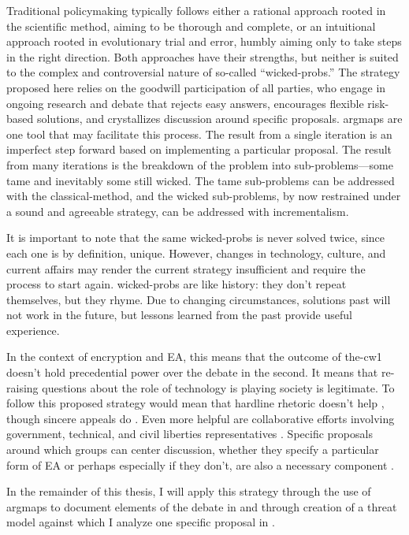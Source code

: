 Traditional policymaking typically follows either a rational approach rooted in the scientific method, aiming to be
thorough and complete, or an intuitional approach rooted in evolutionary trial and error, humbly aiming only to take
steps in the right direction. Both approaches have their strengths, but neither is suited to the complex and
controversial nature of so-called ``\acp{wicked-prob}.'' The strategy proposed here relies on the goodwill participation
of all parties, who engage in ongoing research and debate that rejects easy answers, encourages flexible risk-based
solutions, and crystallizes discussion around specific proposals. \Acp{argmap} are one tool that may facilitate this
process. The result from a single iteration is an imperfect step forward based on implementing a particular proposal.
The result from many iterations is the breakdown of the problem into sub-problems---some tame and inevitably some still
wicked. The tame sub-problems can be addressed with the \ac{classical-method}, and the wicked sub-problems, by now
restrained under a sound and agreeable strategy, can be addressed with \ac{incrementalism}.

It is important to note that the same \acp{wicked-prob} is never solved twice, since each one is by definition, unique.
However, changes in technology, culture, and current affairs may render the current strategy insufficient and require
the process to start again. \Acp{wicked-prob} are like history: they don't repeat themselves, but they rhyme. Due to
changing circumstances, solutions past will not work in the future, but lessons learned from the past provide useful
experience.

In the context of \ac{encryption} and \ac{EA}, this means that the outcome of \ac{the-cw1} doesn't hold precedential
power over the debate in the second. It means that re-raising questions about the role of technology is playing society
is legitimate. To follow this proposed strategy would mean that hardline rhetoric doesn't help \cite{ruiz_there_2018}
\cite{geller_2019}, though sincere appeals do \cite{abelson_2015} \cite{intl_2020} \cite{rozenshtein_2019}. Even more
helpful are collaborative efforts involving government, technical, and civil liberties representatives
\cite{committee_decrypting_2018} \cite{group_2019}. Specific proposals around which groups can center discussion,
whether they specify a particular form of \ac{EA} or perhaps especially if they don't, are also a necessary component
\cite{kerr_encryption_2017} \cite{wright_crypto_2018} \cite{phan_key_2017}.

In the remainder of this thesis, I will apply this strategy through the use of \acp{argmap} to document elements of the
debate in  and through creation of a threat model against which I analyze one specific proposal
in .
